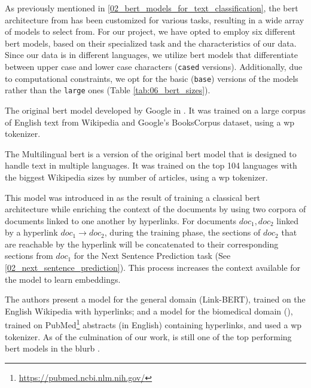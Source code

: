 \label{06_bert_models}



As previously mentioned in \headerName{} \ref{02_bert_models_for_text_classification}, the \gls{bert} architecture from  has been customized for various tasks, resulting in a wide array of models to select from. For our project, we have opted to employ six different \gls{bert} models, based on their specialized task and the characteristics of our data.
Since our data is in different languages, we utilize \gls{bert} models that differentiate between upper case and lower case characters (\texttt{cased} versions). Additionally, due to computational constraints, we opt for the basic (\texttt{base}) versions of the models rather than the \texttt{large} ones (Table \ref{tab:06_bert_sizes}).




\label{06_bert_base}
The original \gls{bert} model developed by Google in . It was trained on a large corpus of English text from Wikipedia and Google’s BooksCorpus dataset, using a \gls{wp} tokenizer.

\label{06_bert_multilingual}
The Multilingual \gls{bert}  is a version of the original \gls{bert} model that is designed to handle text in multiple languages. It was trained on the top 104 languages with the biggest Wikipedia sizes by number of articles, using a \gls{wp} tokenizer. 

\label{06_bert_biolinkbert}

This model was introduced in  as the result of training a classical \gls{bert} architecture while enriching the context of the documents by using two corpora of documents linked to one another by hyperlinks. For documents $doc_1, doc_2$ linked by a hyperlink $doc_1 \to doc_2$, during the training phase, the sections of $doc_2$ that are reachable by the hyperlink will be concatenated to their corresponding sections from $doc_1$ for the Next Sentence Prediction task (See \headerName{} \ref{02_next_sentence_prediction}). This process increases the context available for the model to learn embeddings. 

The authors present a model for the general domain (Link-BERT), trained on the English Wikipedia with hyperlinks; and a model for the biomedical domain (\bertbiolinkbert{}), trained on PubMed\footnote{\url{https://pubmed.ncbi.nlm.nih.gov/}} abstracts (in English) containing hyperlinks, and used a \gls{wp} tokenizer. As of the culmination of our work, \bertbiolinkbert{} is still one of the top performing \gls{bert} models in the \gls{blurb} .


